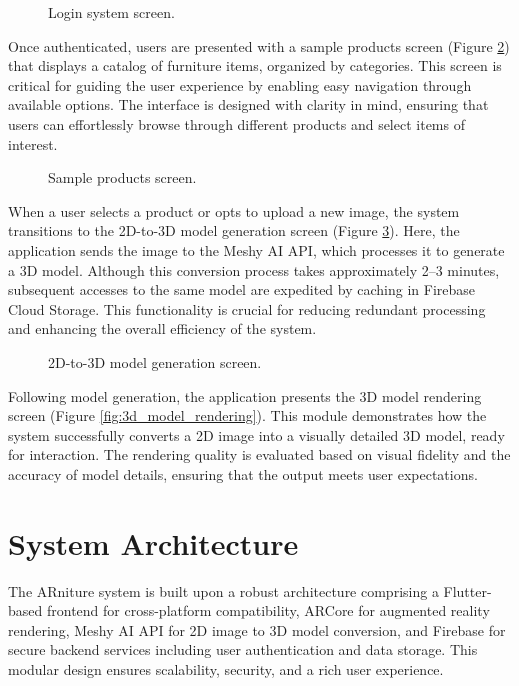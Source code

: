 \documentclass[12pt, a4paper]{article}
\begin{document}
\begin{figure}[htbp]
    \centering
    \caption{Login system screen.}
    \label{fig:login_system}
\end{figure}

Once authenticated, users are presented with a sample products screen (Figure \ref{fig:sample_products}) that displays a catalog of furniture items, organized by categories. This screen is critical for guiding the user experience by enabling easy navigation through available options. The interface is designed with clarity in mind, ensuring that users can effortlessly browse through different products and select items of interest.

\begin{figure}[htbp]
    \centering
    \caption{Sample products screen.}
    \label{fig:sample_products}
\end{figure}

When a user selects a product or opts to upload a new image, the system transitions to the 2D-to-3D model generation screen (Figure \ref{fig:2d_to_3d_generation}). Here, the application sends the image to the Meshy AI API, which processes it to generate a 3D model. Although this conversion process takes approximately 2--3 minutes, subsequent accesses to the same model are expedited by caching in Firebase Cloud Storage. This functionality is crucial for reducing redundant processing and enhancing the overall efficiency of the system.

\begin{figure}[htbp]
    \centering
    \caption{2D-to-3D model generation screen.}
    \label{fig:2d_to_3d_generation}
\end{figure}

Following model generation, the application presents the 3D model rendering screen (Figure \ref{fig:3d_model_rendering}). This module demonstrates how the system successfully converts a 2D image into a visually detailed 3D model, ready for interaction. The rendering quality is evaluated based on visual fidelity and the accuracy of model details, ensuring that the output meets user expectations.



\section{System Architecture}
The ARniture system is built upon a robust architecture comprising a Flutter-based frontend for cross-platform compatibility, ARCore for augmented reality rendering, Meshy AI API for 2D image to 3D model conversion, and Firebase for secure backend services including user authentication and data storage. This modular design ensures scalability, security, and a rich user experience.
\end{document}

